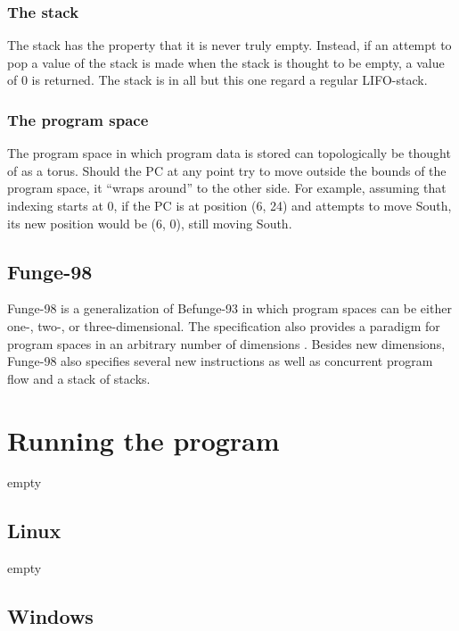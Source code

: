 \documentclass[12pt, a4paper]{article}
\begin{document}
\subsubsection{The stack}
\label{sec:stack}

The stack has the property that it is never truly empty. Instead, if an attempt to pop a value of the stack is made when the stack is thought to be empty, a value of 0 is returned. The stack is in all but this one regard a regular LIFO-stack.

\subsubsection{The program space}

The program space in which program data is stored can topologically be thought of as a torus. Should the PC at any point try to move outside the bounds of the program space, it “wraps around” to the other side. For example, assuming that indexing starts at 0, if the PC is at position (6, 24) and attempts to move South, its new position would be \linebreak (6, 0), still moving South.

\subsection{Funge-98}
\label{sec:funge98}

Funge-98 is a generalization of Befunge-93 in which program spaces can be either one-, two-, or three-dimensional. The specification also provides a paradigm for program spaces in an arbitrary number of dimensions \cite{funge98}. Besides new dimensions, Funge-98 also specifies several new instructions as well as concurrent program flow and a stack of stacks.

\section{Running the program}
\label{sec:howtorun}

empty

\subsection{Linux}
\label{sec:runlinux}

empty

\subsection{Windows}
\label{sec:runwindows}
\end{document}
